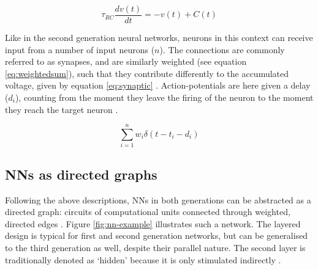 \documentclass[report.tex]{subfiles}
\begin{document}
\begin{equation}
  \tau_{RC}\frac{dv(t)}{dt} = -v(t) + C(t)
  \label{eq:lif}
\end{equation}

Like in the second generation neural networks, neurons in this context
can receive input from a number of input neurons ($n$).
The connections are commonly referred to as synapses, and are similarly
weighted (see equation \ref{eq:weightedsum}), 
such that they contribute differently to the accumulated 
voltage, given by equation \ref{eq:synaptic} \cite{Dayan2001}.
Action-potentials are here given a delay ($d_i$),
counting from the moment they leave the
firing of the neuron to the moment they reach the target neuron
\cite[p. 234]{Dayan2001}. 

\begin{equation}
  \sum_{i=1}^n{w_i\delta(t - t_i - d_i)}
  \label{eq:synaptic}
\end{equation}


\begin{comment}
To align digital representations with neural spikes,
signals are encoded and decoded when entering and leaving the system
respectively \cite{Dayan2001}.
Because of the temporal nature of spiking neural networks, probability
distributions are commonly used to describe 
Given a current for background firing rates
Assuming there are $n$ inputs to a neuron with $i$ bits of information,
an encoder
\end{comment}

\subsection{\Gls{NN}s as directed graphs}
Following the above descriptions, \gls{NN}s in both generations
can be abstracted as a directed graph: circuits of computational
units connected through	weighted, directed edges
\cite{Dayan2001, Eliasmith2004, Russel2007}.
Figure \ref{fig:nn-example} illustrates such a network.
The layered design is typical for first and second generation networks, but 
can be generalised to the third generation as well, despite their parallel
nature.
The second layer is traditionally denoted as `hidden' because it is only
stimulated indirectly \cite{Russel2007}.
\end{document}

